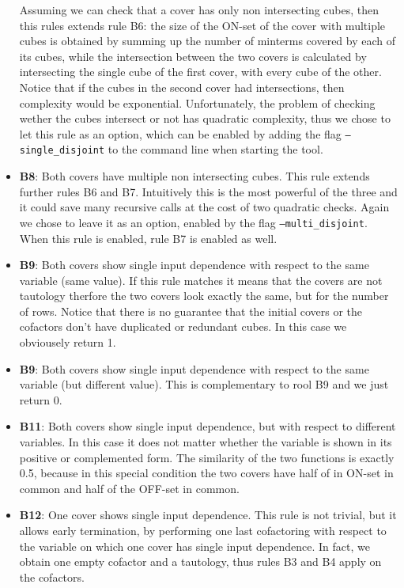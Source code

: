 \documentclass{acm_proc_article-sp}
\begin{document}
\begin{itemize}
    Assuming we can check that a cover has only non intersecting cubes, then this
    rules extends rule B6: the size of the ON-set of the cover with multiple
    cubes is obtained by summing up the number of minterms covered by each of
    its cubes, while the intersection between the two covers is calculated by
    intersecting the single cube of the first cover, with every cube of the
    other. Notice that if the cubes in the second cover had intersections, then
    complexity would be exponential.
    Unfortunately, the problem of checking wether the cubes intersect or not
    has quadratic complexity, thus we chose to let this rule as an option, which
    can be enabled by adding the flag \texttt{--single\_disjoint} to the command
    line when starting the tool.
  \item {\bf B8}: Both covers have multiple non intersecting cubes. This rule
    extends further rules B6 and B7. Intuitively this is the most powerful
    of the three and it could save many recursive calls at the cost of two
    quadratic checks. Again we chose to leave it as an option, enabled by
    the flag \texttt{--multi\_disjoint}. When this rule is enabled, rule B7
    is enabled as well.
  \item {\bf B9}: Both covers show single input dependence with respect to
    the same variable (same value). If this rule matches it means that the
    covers are not tautology therfore the two covers look exactly the same,
    but for the number of rows. Notice that there is no guarantee that the
    initial covers or the cofactors don't have duplicated or redundant
    cubes. In this case we obviousely return 1.
  \item {\bf B9}: Both covers show single input dependence with respect to
    the same variable (but different value). This is complementary to rool
    B9 and we just return 0.
  \item {\bf B11}: Both covers show single input dependence, but with respect
    to different variables. In this case it does not matter whether the variable
    is shown in its positive or complemented form. The similarity of the
    two functions is exactly 0.5, because in this special condition the two
    covers have half of in ON-set in common and half of the OFF-set in common.
  \item {\bf B12}: One cover shows single input dependence. This rule is not
    trivial, but it allows early termination, by performing one last cofactoring
    with respect to the variable on which one cover has single input dependence.
    In fact, we obtain one empty cofactor and a tautology, thus rules B3 and
    B4 apply on the cofactors.
\end{itemize}
\end{document}
